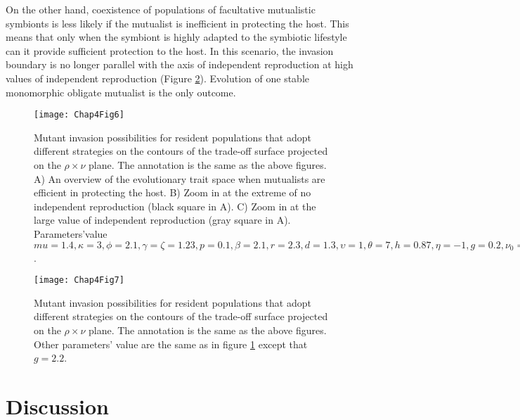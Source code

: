 \documentclass[11.5pt]{article}
\begin{document}
\medskip

On the other hand, coexistence of populations of facultative mutualistic symbionts is less likely if the mutualist is inefficient in protecting the host. This means that only when the symbiont is highly adapted to the symbiotic lifestyle can it provide sufficient protection to the host. In this scenario, the invasion boundary is no longer parallel with the axis of independent reproduction at high values of independent reproduction (Figure \ref{Chap5fig7}). Evolution of one stable monomorphic obligate mutualist is the only outcome.

\begin{figure} [H]
    \centering
    \texttt{[image: Chap4Fig6]}
    \caption[Evolutionary trajectories in case of high-cost adaptation and efficient host protection]{Mutant invasion possibilities for resident populations that adopt different strategies on the contours of the trade-off surface projected on the $\rho \times \nu$ plane. The annotation is the same as the above figures. A) An overview of the evolutionary trait space when mutualists are efficient in protecting the host. B) Zoom in at the extreme of no independent reproduction (black square in A). C) Zoom in at the large value of independent reproduction (gray square in A). Parameters'value $mu=1.4, \kappa=3, \phi=2.1, \gamma=\zeta=1.23, p=0.1, \beta=2.1, r=2.3, d=1.3,\upsilon=1, \theta=7, h=0.87, \eta=-1, g=0.2, \nu_0=0.5$.}
    \label{Chap5fig6}
\end{figure}

\begin{figure} [H]
    \centering
    \texttt{[image: Chap4Fig7]}
    \caption[Evolutionary trajectories in case of high-cost adaptation and inefficient host protection]{Mutant invasion possibilities for resident populations that adopt different strategies on the contours of the trade-off surface projected on the $\rho \times \nu$ plane. The annotation is the same as the above figures. Other parameters' value are the same as in figure \ref{Chap5fig6} except that $g = 2.2$.}
    \label{Chap5fig7}
\end{figure}

\section{Discussion}
\end{document}
